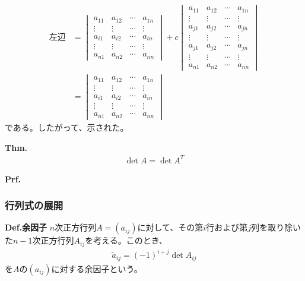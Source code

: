 \documentclass[a4paper,11pt]{jsarticle}
\numberwithin{equation}{section}
\begin{document}
\begin{align}
  \text{左辺} &= 
  \begin{vmatrix}
    a_{11} & a_{12} & \cdots & a_{1n}\\
    \vdots & \vdots & \cdots & \vdots\\
    a_{i1} & a_{i2} & \cdots & a_{in}\\
    \vdots & \vdots & \cdots & \vdots\\
    a_{n1} & a_{n2} & \cdots & a_{nn}
  \end{vmatrix}
  +c
  \begin{vmatrix}
    a_{11} & a_{12} & \cdots & a_{1n}\\
    \vdots & \vdots & \cdots & \vdots\\
    a_{j1} & a_{j2} & \cdots & a_{jn}\\
    \vdots & \vdots & \cdots & \vdots\\
    a_{j1} & a_{j2} & \cdots & a_{jn}\\
    \vdots & \vdots & \cdots & \vdots\\
    a_{n1} & a_{n2} & \cdots & a_{nn}
  \end{vmatrix}
  \\
  &=
  \begin{vmatrix}
    a_{11} & a_{12} & \cdots & a_{1n}\\
    \vdots & \vdots & \cdots & \vdots\\
    a_{i1} & a_{i2} & \cdots & a_{in}\\
    \vdots & \vdots & \cdots & \vdots\\
    a_{n1} & a_{n2} & \cdots & a_{nn}
  \end{vmatrix}
\end{align}
である。したがって、示された。\hfill\qedsymbol\\

\begin{itembox}[l]{\textbf{Thm.}}
  \begin{align}
    \det A = \det A^T
  \end{align}
\end{itembox}
\textbf{Prf.}\\


\subsubsection{行列式の展開}
\begin{itembox}[l]{\textbf{Def.余因子}}
  $n$次正方行列$A=(a_{ij})$に対して、その第$i$行および第$j$列を取り除いた$n-1$次正方行列$A_{ij}$を考える。このとき、
  \begin{align}
    \tilde{a}_{ij} = (-1)^{i+j} \det A_{ij}
  \end{align}
  を$A$の$(a_{ij})$に対する余因子という。
\end{itembox}
\end{document}
